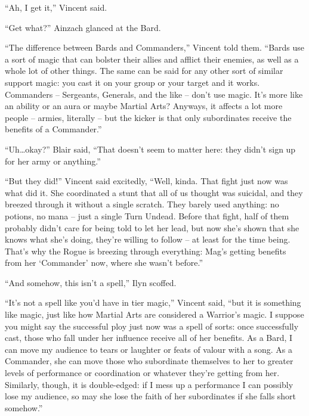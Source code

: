  

“Ah, I get it,” Vincent said.

 

“Get what?” Ainzach glanced at the Bard.

 

“The difference between Bards and Commanders,” Vincent told them. “Bards use a sort of magic that can bolster their allies and afflict their enemies, as well as a whole lot of other things. The same can be said for any other sort of similar support magic: you cast it on your group or your target and it works. Commanders – Sergeants, Generals, and the like – don’t use magic. It’s more like an ability or an aura or maybe Martial Arts? Anyways, it affects a lot more people – armies, literally – but the kicker is that only subordinates receive the benefits of a Commander.”

 

“Uh…okay?” Blair said, “That doesn’t seem to matter here: they didn’t sign up for her army or anything.”

 

“But they did!” Vincent said excitedly, “Well, kinda. That fight just now was what did it. She coordinated a stunt that all of us thought was suicidal, and they breezed through it without a single scratch. They barely used anything: no potions, no mana – just a single Turn Undead. Before that fight, half of them probably didn’t care for being told to let her lead, but now she’s shown that she knows what she’s doing, they’re willing to follow – at least for the time being. That’s why the Rogue is breezing through everything: Mag’s getting benefits from her ‘Commander’ now, where she wasn’t before.”

 

“And somehow, this isn’t a spell,” Ilyn scoffed.

 

“It’s not a spell like you’d have in tier magic,” Vincent said, “but it is something like magic, just like how Martial Arts are considered a Warrior’s magic. I suppose you might say the successful ploy just now was a spell of sorts: once successfully cast, those who fall under her influence receive all of her benefits. As a Bard, I can move my audience to tears or laughter or feats of valour with a song. As a Commander, she can move those who subordinate themselves to her to greater levels of performance or coordination or whatever they’re getting from her. Similarly, though, it is double-edged: if I mess up a performance I can possibly lose my audience, so may she lose the faith of her subordinates if she falls short somehow.”

